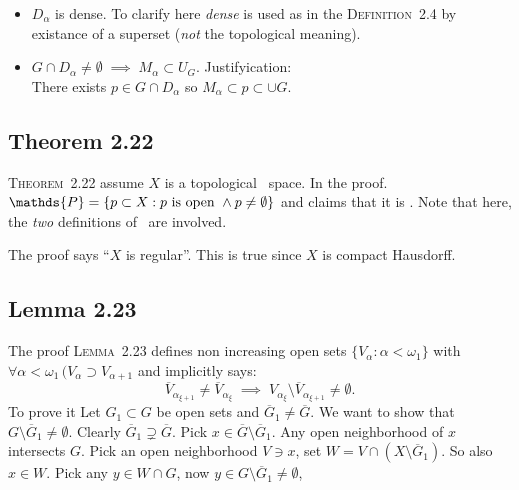 \begin{itemize}
\item \(D_\alpha\) is dense. To clarify here \emph{dense} 
  is used as in the \textsc{Definition}~2.4
  by existance of a superset (\emph{not} the topological meaning).

\item \(G\cap D_\alpha\neq\emptyset\;\implies\; M_\alpha \subset U_G\).
   Justifyication:\\
   There exists \(p \in G\cap D_\alpha\) so \(M_\alpha \subset p \subset \cup G\).

\end{itemize}

\subsection{Theorem 2.22}

\textsc{Theorem}~2.22 assume $X$ is a topological \ccc\ space.
In the proof. 
\(\mathds{P} = \{p\subset X: p\textnormal{ is open } \land p\neq\emptyset\}\) 
and claims that it is \ccc. 
Note that here, the \emph{two} definitions of \ccc\ are involved.

The proof says ``$X$ is regular''. This is true
since $X$ is compact Hausdorff.

\subsection{Lemma 2.23}

The proof \textsc{Lemma}~2.23 
defines non increasing open sets \(\{V_\alpha:\alpha<\omega_1\}\)
with \(\forall \alpha<\omega_1\,(V_\alpha \supset V_{\alpha+1}\)
and implicitly says:
\begin{equation*}
\overline{V}_{\alpha_{\xi+1}} \neq \overline{V}_{\alpha_\xi}
\;\implies\;
V_{\alpha_\xi} \setminus \overline{V}_{\alpha_{\xi+1}} \neq \emptyset.
\end{equation*}
To prove it Let \(G_1 \subset G\) be open sets
and \(\overline{G}_1 \neq \overline{G}\).
We want to show that \(G\setminus \overline{G}_1\neq \emptyset\).
Clearly  \(\overline{G}_1 \supsetneq \overline{G}\).
Pick \(x\in \overline{G}\setminus\overline{G}_1\).
Any open neighborhood of $x$ intersects $G$.
Pick an open neighborhood \(V\ni x\),
set \(W=V\cap (X\setminus \overline{G}_1)\).
So also \(x \in W\). Pick any \(y \in W\cap G\), 
now \(y\in G \setminus \overline{G}_1 \neq \emptyset\),

